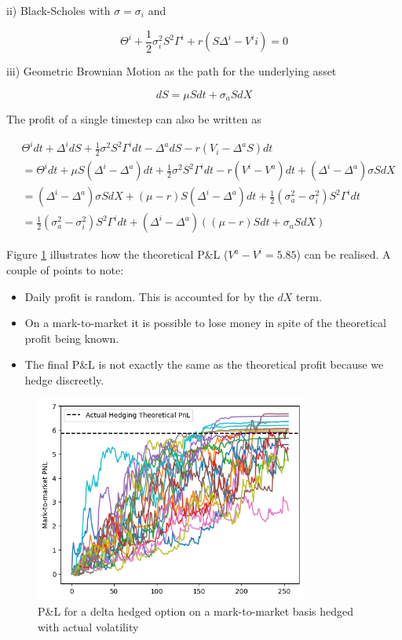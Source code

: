 \documentclass{article}
\newcommand{\para}{\vspace{8pt}} %
\begin{document}
\para
ii) Black-Scholes with $\sigma = \sigma_i$ and 

\[
\Theta^i + \frac{1}{2} \sigma_i^2 S^2 \Gamma^i + r (S \Delta^i - V^ii) = 0
\]

\para
iii) Geometric Brownian Motion as the path for the underlying asset


\[
dS = \mu S dt + \sigma_a S dX
\]

The profit of a single timestep can also be written as

\begin{center}
\begin{align*}
& \Theta^i dt + \Delta^i dS + \frac{1}{2} \sigma^2 S^2 \Gamma ^i dt - \Delta^a dS -r(V_i - \Delta^a S) dt\\[2pt]
&= \Theta^i dt + \mu S(\Delta^i - \Delta^a) dt + \frac{1}{2} \sigma^2 S^2 \Gamma^i dt - r (V^i - V^a) dt + (\Delta^i - \Delta^a) \sigma S dX\\[2pt]
&= (\Delta^i - \Delta^a) \sigma S dX + (\mu - r) S (\Delta^i - \Delta^a) dt + \frac{1}{2} (\sigma_a^2 - \sigma_i^2) S^2 \Gamma^i dt\\[2pt]
&= \frac{1}{2}( \sigma_a^2 - \sigma_i^2) S^2 \Gamma^i dt + (\Delta^i - \Delta^a) ((\mu -r) S dt + \sigma_a S dX)
\end{align*}
\end{center}


Figure \ref{fig:actual_volatility_hedging} illustrates how the theoretical P\&L ($V^a - V^i = 5.85$) can be realised. A couple of points to note:

\begin{itemize}
    \item Daily profit is random. This is accounted for by the $dX$ term.
    \item On a mark-to-market it is possible to lose money in spite of the theoretical profit being known.
    \item The final P\&L is not exactly the same as the theoretical profit because we hedge discreetly.
\end{itemize}

 
\begin{figure}[h]
\centering
\includegraphics[width=0.8\textwidth]{images/actual_volatility_hedging.png}
\caption{P\&L for a delta hedged option on a mark-to-market basis hedged with actual volatility}
\label{fig:actual_volatility_hedging}
\end{figure}
\end{document}

